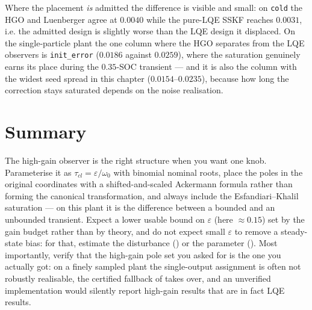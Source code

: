 Where the placement \emph{is} admitted the difference is visible and small: on \texttt{cold} the
HGO and Luenberger agree at $0.0040$ while the pure-LQE SSKF reaches $0.0031$, i.e. the admitted
design is slightly worse than the LQE design it displaced.  On the single-particle plant the one
column where the HGO separates from the LQE observers is \texttt{init\_error} ($0.0186$ against
$0.0259$), where the saturation genuinely earns its place during the $0.35$-SOC transient --- and
it is also the column with the widest seed spread in this chapter ($0.0154$--$0.0235$), because
how long the correction stays saturated depends on the noise realisation.

\section{Summary}
The high-gain observer is the right structure when you want one knob.  Parameterise it as
$\tau_{cl} = \varepsilon/\omega_0$ with binomial nominal roots, place the poles in the original
coordinates with a shifted-and-scaled Ackermann formula rather than forming the canonical
transformation, and always include the Esfandiari--Khalil saturation --- on this plant it is the
difference between a bounded and an unbounded transient.  Expect a lower usable bound on
$\varepsilon$ (here $\approx0.15$) set by the gain budget rather than by theory, and do not expect
small $\varepsilon$ to remove a steady-state bias: for that, estimate the disturbance
() or the parameter ().  Most importantly, verify that the
high-gain pole set you asked for is the one you actually got: on a finely sampled plant the
single-output assignment is often not robustly realisable, the certified fallback of
 takes over, and an unverified implementation would silently report
high-gain results that are in fact LQE results.
